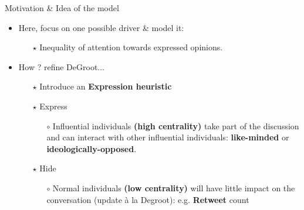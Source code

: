 \documentclass[xcolor=table,handout]{beamer}
\begin{document}
\begin{frame}{Motivation \& Idea of the model}
\begin{itemize} \setlength\itemsep{1em}
	\item Here, focus on one possible driver \& model it: 
		\begin{itemize} \setlength\itemsep{1em}
			\item[$\star$] Inequality of attention towards expressed opinions. 
		\end{itemize}
	\item How ? refine DeGroot...
		\begin{itemize}  \setlength\itemsep{1em}
			\item[$\star$] Introduce an {\bf\color{purple}Expression heuristic}
			\item[$\star$] Express  \begin{itemize} \item[$\circ$] Influential individuals {\bf\color{purple}(high centrality)} take part of the discussion and can interact with other influential individuals: {\bf\color{purple}like-minded} or {\bf\color{purple}ideologically-opposed}. \end{itemize}
			\item[$\star$] Hide \begin{itemize} \item[$\circ$] Normal individuals {\bf\color{purple}(low centrality)} will have little impact on the conversation (update \`{a} la Degroot): e.g. {\bf\color{purple}Retweet} count  \end{itemize}
		\end{itemize}
\end{itemize}
\end{frame}
\end{document}
